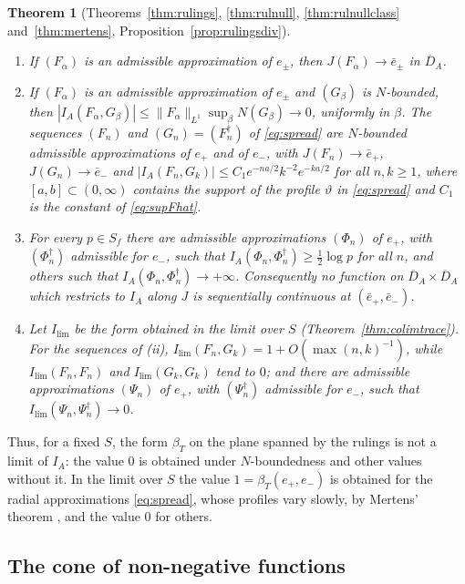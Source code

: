 \documentclass[11pt]{amsart}
\newtheorem{theorem}{Theorem}[section]
\theoremstyle{definition}
\theoremstyle{remark}
\begin{document}
\begin{theorem}[Theorems~\ref{thm:rulings}, \ref{thm:rulnull},
\ref{thm:rulnullclass} and~\ref{thm:mertens},
Proposition~\ref{prop:rulingsdiv}]\label{thm:introD}
\begin{enumerate}
\item[(i)] If $(F_{\alpha})$ is an admissible approximation of $e_{\pm}$, then
$J(F_{\alpha})\to\bar e_{\pm}$ in $\overline{D}_A$.
\item[(ii)] If $(F_{\alpha})$ is an admissible approximation of $e_{\pm}$ and
$(G_{\beta})$ is $N$-bounded, then
$|I_A(F_{\alpha},G_{\beta})|\le\lVert F_{\alpha}\rVert_{L^{1}}
\sup_{\beta}N(G_{\beta})\to0$, uniformly in $\beta$.  The sequences $(F_n)$
and $(G_n)=(F_n^{\dagger})$ of \eqref{eq:spread} are $N$-bounded admissible
approximations of $e_+$ and of $e_-$, with $J(F_n)\to\bar e_+$,
$J(G_n)\to\bar e_-$ and
$|I_A(F_n,G_k)|\le C_1e^{-na/2}k^{-2}e^{-ka/2}$ for all $n,k\ge1$, where
$[a,b]\subset(0,\infty)$ contains the support of the profile $\vartheta$ in
\eqref{eq:spread} and $C_1$ is the constant of \eqref{eq:supFhat}.
\item[(iii)] For every $p\in S_f$ there are admissible approximations
$(\Phi_n)$ of $e_+$, with $(\Phi_n^{\dagger})$ admissible for $e_-$, such that
$I_A(\Phi_n,\Phi_n^{\dagger})\ge\tfrac12\log p$ for all $n$, and others such
that $I_A(\Phi_n,\Phi_n^{\dagger})\to+\infty$.  Consequently no function on
$\overline{D}_A\times\overline{D}_A$ which restricts to $I_A$ along $J$ is
sequentially continuous at $(\bar e_+,\bar e_-)$.
\item[(iv)] Let $I_{\lim}$ be the form obtained in the limit over $S$
(Theorem~\ref{thm:colimtrace}).  For the sequences of \emph{(ii)},
$I_{\lim}(F_n,G_k)=1+O(\max(n,k)^{-1})$, while
$I_{\lim}(F_n,F_n)$ and $I_{\lim}(G_k,G_k)$ tend to $0$; and there are
admissible approximations $(\Psi_n)$ of $e_+$, with $(\Psi_n^{\dagger})$
admissible for $e_-$, such that $I_{\lim}(\Psi_n,\Psi_n^{\dagger})\to0$.
\end{enumerate}
\end{theorem}

Thus, for a fixed $S$, the form $\beta_T$ on the plane spanned by the rulings
is not a limit of $I_A$: the value $0$ is obtained under $N$-boundedness and
other values without it.  In the limit over $S$ the value
$1=\beta_T(e_+,e_-)$ is obtained for the radial approximations
\eqref{eq:spread}, whose profiles vary slowly, by Mertens' theorem
\cite{Mertens}, and the value $0$ for others.

\subsection*{The cone of non-negative functions}
\end{document}
